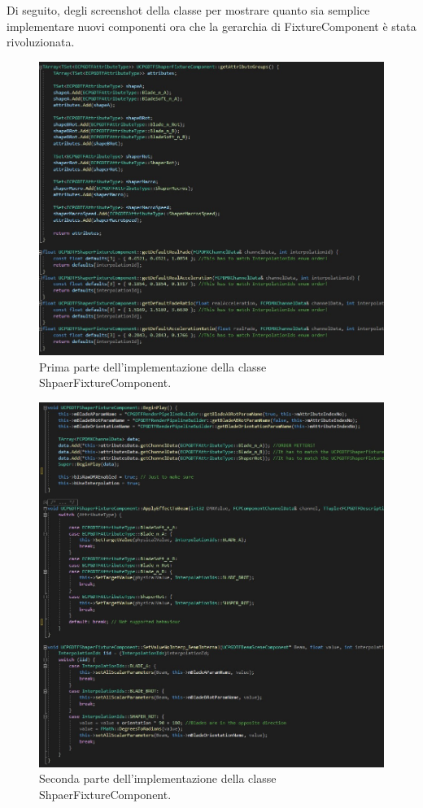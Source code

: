 \documentclass[main.tex]{subfiles}
\begin{document}
Di seguito, degli screenshot della classe per mostrare quanto sia semplice implementare nuovi componenti ora che la gerarchia di FixtureComponent è stata rivoluzionata.
\begin{figure}[H]
    \centering
    \includegraphics[width=1\linewidth]{img/newFeatures/ShaperComponentCode1.jpg}
    \caption{Prima parte dell'implementazione della classe ShpaerFixtureComponent.}
    \label{fig:5_ShaperComponentCode1}
\end{figure}
\begin{figure}[H]
    \centering
    \includegraphics[width=1\linewidth]{img/newFeatures/ShaperComponentCode2.jpg}
    \caption{Seconda parte dell'implementazione della classe ShpaerFixtureComponent.}
    \label{fig:5_ShaperComponentCode2}
\end{figure}
\end{document}
